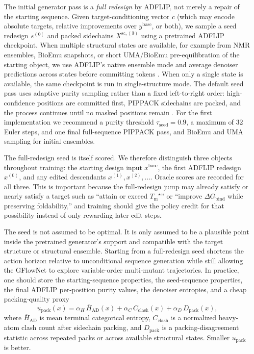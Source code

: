 \documentclass[11pt]{article}
\newcommand{\packunc}{\ensuremath{u_{\mathrm{pack}}}}
\newcommand{\Tm}{\ensuremath{T_{\mathrm m}}}
\newcommand{\DGbind}{\ensuremath{\Delta G_{\mathrm{bind}}}}
\begin{document}
	The initial generator pass is a \emph{full redesign} by ADFLIP, not merely a repair of the starting sequence. Given target-conditioning vector $c$ (which may encode absolute targets, relative improvements over $y^{\mathrm{base}}$, or both), we sample a seed redesign $s^{(0)}$ and packed sidechains $X^{\mathrm{sc},(0)}$ using a pretrained ADFLIP checkpoint. When multiple structural states are available, for example from NMR ensembles, BioEmu snapshots, or short UMA/BioEmu pre-equilibration of the starting object, we use ADFLIP's native ensemble mode and average denoiser predictions across states before committing tokens \citep{yi2025adflip}. When only a single state is available, the same checkpoint is run in single-structure mode. The default seed pass uses adaptive purity sampling rather than a fixed left-to-right order: high-confidence positions are committed first, PIPPACK sidechains are packed, and the process continues until no masked positions remain \citep{yi2025adflip,randolph2024pippack}. For the first implementation we recommend a purity threshold $\tau_{\mathrm{seed}}=0.9$, a maximum of 32 Euler steps, and one final full-sequence PIPPACK pass, and BioEmu and UMA sampling for initial ensembles. 
	
	The full-redesign seed is itself scored. We therefore distinguish three objects throughout training: the starting design input $x^{\mathrm{base}}$, the first ADFLIP redesign $x^{(0)}$, and any edited descendants $x^{(1)},x^{(2)},\ldots$. Oracle scores are recorded for all three. This is important because the full-redesign jump may already satisfy or nearly satisfy a target such as ``attain or exceed $\Tm^\star$'' or ``improve \DGbind{} while preserving foldability,'' and training should give the policy credit for that possibility instead of only rewarding later edit steps.
	
	The seed is not assumed to be optimal. It is only assumed to be a plausible point inside the pretrained generator's support and compatible with the target structure or structural ensemble. Starting from a full-redesign seed shortens the action horizon relative to unconditional sequence generation while still allowing the GFlowNet to explore variable-order multi-mutant trajectories. In practice, one should store the starting-sequence properties, the seed-sequence properties, the final ADFLIP per-position purity values, the denoiser entropies, and a cheap packing-quality proxy
	\begin{equation}
		\label{eq:packuncdef}
		\packunc(x)=\alpha_H\,\overline{H}_{\mathrm{AD}}(x)+\alpha_C\,C_{\mathrm{clash}}(x)+\alpha_D\,D_{\mathrm{pack}}(x),
	\end{equation}
	where $\overline{H}_{\mathrm{AD}}$ is mean terminal categorical entropy, $C_{\mathrm{clash}}$ is a normalized heavy-atom clash count after sidechain packing, and $D_{\mathrm{pack}}$ is a packing-disagreement statistic across repeated packs or across available structural states. Smaller \packunc{} is better.
	
\end{document}
